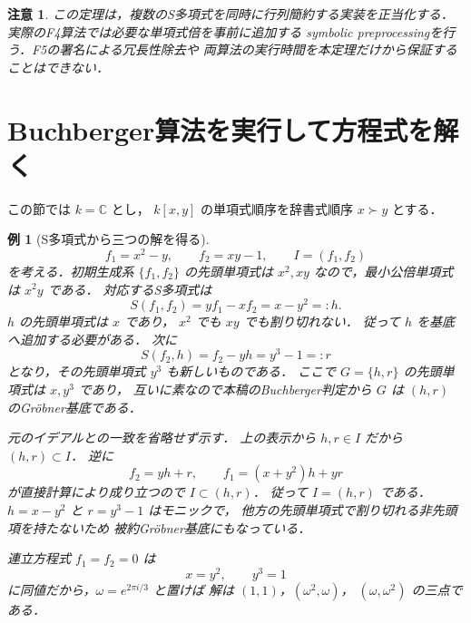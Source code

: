 \documentclass[a5paper,10pt,onecolumn]{jsarticle}
\theoremstyle{mathnotetheorem}
\newtheorem{example}[theorem]{例}
\newtheorem{remark}[theorem]{注意}
\begin{document}
\begin{remark}
この定理は，複数のS多項式を同時に行列簡約する実装を正当化する．
実際のF4算法では必要な単項式倍を事前に追加する
symbolic preprocessingを行う．F5の署名による冗長性除去や
両算法の実行時間を本定理だけから保証することはできない．
\end{remark}


\section{Buchberger算法を実行して方程式を解く}
この節では $k=\mathbb C$ とし，
$k[x,y]$ の単項式順序を辞書式順序 $x\succ y$ とする．
\begin{example}[S多項式から三つの解を得る]\label{ex:gb-full}
\[
 f_1=x^2-y,\qquad f_2=xy-1,\qquad I=(f_1,f_2)
\]
を考える．初期生成系 $\{f_1,f_2\}$ の先頭単項式は
$x^2,xy$ なので，最小公倍単項式は $x^2y$ である．
対応するS多項式は
\[
 S(f_1,f_2)=yf_1-xf_2=x-y^2=:h.
\]
$h$ の先頭単項式は $x$ であり，
$x^2$ でも $xy$ でも割り切れない．
従って $h$ を基底へ追加する必要がある．
次に
\[
 S(f_2,h)=f_2-yh=y^3-1=:r
\]
となり，その先頭単項式 $y^3$ も新しいものである．
ここで $G=\{h,r\}$ の先頭単項式は $x,y^3$ であり，
互いに素なので本稿のBuchberger判定から
$G$ は $(h,r)$ のGr\"obner基底である．

元のイデアルとの一致を省略せず示す．
上の表示から $h,r\in I$ だから $(h,r)\subset I$．
逆に
\[
 f_2=yh+r,\qquad
 f_1=(x+y^2)h+yr
\]
が直接計算により成り立つので $I\subset(h,r)$．
従って $I=(h,r)$ である．
$h=x-y^2$ と $r=y^3-1$ はモニックで，
他方の先頭単項式で割り切れる非先頭項を持たないため
被約Gr\"obner基底にもなっている．

連立方程式 $f_1=f_2=0$ は
\[
 x=y^2,\qquad y^3=1
\]
に同値だから，$\omega=e^{2\pi i/3}$ と置けば
解は $(1,1)$，$(\omega^2,\omega)$，
$(\omega,\omega^2)$ の三点である．
\end{example}
\end{document}

